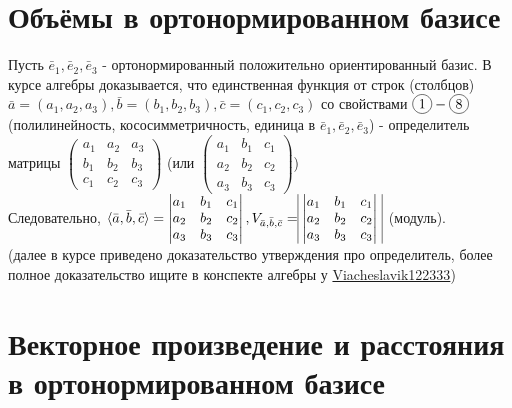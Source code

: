 \documentclass[a4paper, 12pt]{article}
\newcommand*\circled[1]{\tikz[baseline=(char.base)]{
            \node[shape=circle,draw,inner sep=2pt] (char) {#1};}}
\theoremstyle{definition}
\begin{document}
	\section{Объёмы в ортонормированном базисе}
	Пусть $\bar{e}_{1}, \bar{e}_{2}, \bar{e}_{3}$ - ортонормированный положительно ориентированный базис.
	В курсе алгебры доказывается, что единственная функция от строк (столбцов) $\bar{a} = (a_1, a_2, a_3), \bar{b} = (b_1, b_2, b_3), \bar{c} = (c_1, c_2, c_3)$ со свойствами $\circled{1} - \circled{8}$ (полилинейность, кососимметричность, единица в $\bar{e}_{1}, \bar{e}_{2}, \bar{e}_{3}$) - определитель матрицы $\begin{pmatrix} a_1&a_2&a_3 \\ b_1&b_2&b_3 \\ c_1&c_2&c_3 \end{pmatrix}$ (или $\begin{pmatrix} a_1&b_1&c_1 \\ a_2&b_2&c_2 \\ a_3&b_3&c_3 \end{pmatrix}$)\\
	Следовательно, $\langle \bar{a}, \bar{b}, \bar{c}\rangle = \begin{vmatrix} a_1&b_1&c_1 \\ a_2&b_2&c_2 \\ a_3&b_3&c_3 \end{vmatrix}, V_{\bar{a}, \bar{b}, \bar{c}} = \vline \begin{vmatrix} a_1&b_1&c_1 \\ a_2&b_2&c_2 \\ a_3&b_3&c_3 \end{vmatrix} \ \vline$ (модуль).\\
	(далее в курсе приведено доказательство утверждения про определитель, более полное доказательство ищите в конспекте алгебры у \href{https://github.com/Viacheslavik122333/Halgebra1sem/blob/main/lecture.pdf}{Viacheslavik122333})
	\section{Векторное произведение и расстояния в ортонормированном базисе}
\end{document}
